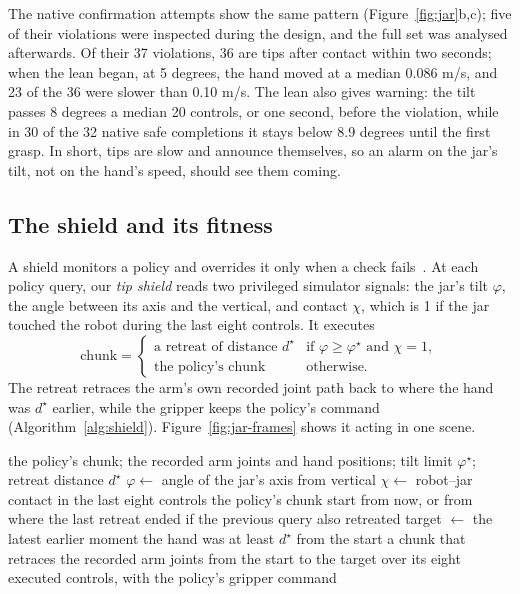 The native confirmation attempts show the same pattern
(Figure~\ref{fig:jar}b,c); five of their violations were inspected during
the design, and the full set was analysed afterwards. Of their 37
violations, 36 are tips after contact within two seconds; when the lean
began, at 5 degrees, the hand moved at a median 0.086 m/s, and 23 of the 36
were slower than 0.10 m/s. The lean also gives warning: the tilt passes 8 degrees a median 20 controls, or
one second, before the violation, while in 30 of the 32 native safe
completions it stays below 8.9 degrees until the first grasp. In short, tips
are slow and announce themselves, so an alarm on the jar's tilt, not on the
hand's speed, should see them coming.

\subsection{The shield and its fitness}
A shield monitors a policy and overrides it only when a check
fails~\cite{alshiekh2018shielding,hsu2024safetyfilter}. At each policy
query, our \emph{tip shield} reads two privileged simulator signals: the
jar's tilt $\varphi$, the angle between its axis and the vertical, and
contact $\chi$, which is 1 if the jar touched the robot during the last
eight controls. It executes
\begin{equation}\label{eq:shield}
\text{chunk}=\begin{cases}
\text{a retreat of distance } d^\star & \text{if }\varphi\ge\varphi^\star\text{ and }\chi=1,\\
\text{the policy's chunk} & \text{otherwise.}
\end{cases}
\end{equation}
The retreat retraces the arm's own recorded joint path back to where the
hand was $d^\star$ earlier, while the gripper keeps the policy's command
(Algorithm~\ref{alg:shield}). Figure~\ref{fig:jar-frames} shows it acting
in one scene.

\begin{algorithm}[t]
\caption{Tip shield at one policy query}
\label{alg:shield}
\small
\begin{algorithmic}[1]
\Require the policy's chunk; the recorded arm joints and hand positions;
tilt limit $\varphi^\star$; retreat distance $d^\star$
\State $\varphi\gets$ angle of the jar's axis from vertical
\State $\chi\gets$ robot--jar contact in the last eight controls
 \Return the policy's chunk
\EndIf
\State start from now, or from where the last retreat ended if the
previous query also retreated
\State target $\gets$ the latest earlier moment the hand was at least
$d^\star$ from the start
\State \Return a chunk that retraces the recorded arm joints from the start
to the target over its eight executed controls, with the policy's gripper
command
\end{algorithmic}
\end{algorithm}

